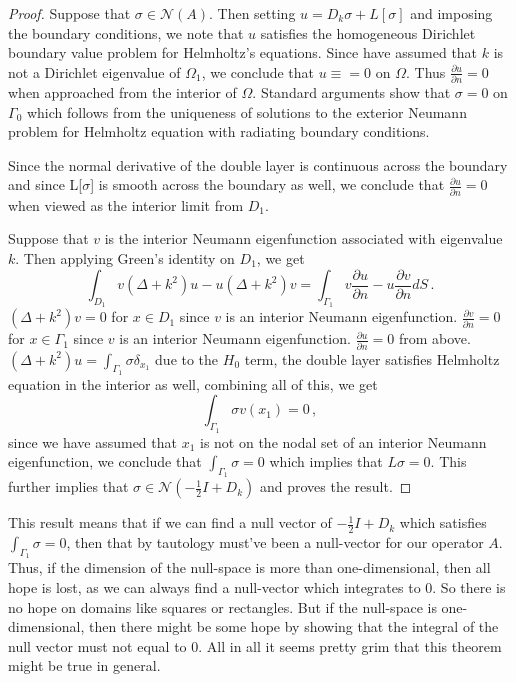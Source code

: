 \documentclass[preprint,12pt]{article}
\def\cN{{\mathcal N}}
\begin{document}
\begin{proof}
Suppose that $\sigma \in \cN(A)$. Then setting $u = D_{k} \sigma + L[\sigma]$ and imposing the boundary conditions, 
we note that $u$ satisfies the homogeneous Dirichlet boundary value problem for Helmholtz's equations. 
Since have assumed that $k$ is not a Dirichlet eigenvalue of $\Omega_{1}$, we conclude that
$u\equiv = 0$ on $\Omega$. 
Thus $\frac{\partial u}{\partial n} = 0$ when approached from the interior of $\Omega$. 
Standard arguments show that $\sigma =0$ on $\Gamma_{0}$ which follows from the uniqueness of solutions
to the exterior Neumann problem for Helmholtz equation with radiating boundary conditions.

Since the normal derivative of the double layer is continuous across the boundary and since L[$\sigma$] 
is smooth across the boundary as well, we conclude that $\frac{\partial u}{\partial n} = 0$ 
when viewed as the interior limit from $D_{1}$. 


Suppose that $v$ is the interior Neumann eigenfunction associated with eigenvalue $k$. 
Then applying Green's identity on $D_{1}$, we get
\begin{equation}
\int_{D_{1}} v (\Delta + k^2) u - u (\Delta+k^2) v =
\int_{\Gamma_{1}} v \frac{\partial u}{\partial n} - u \frac{\partial v}{\partial n} dS \, .
\end{equation}
$(\Delta + k^2)v = 0$ for $x\in D_{1}$ since $v$ is an interior Neumann eigenfunction.
$\frac{\partial v}{\partial n} = 0$ for $x\in \Gamma_{1}$ since $v$ is an interior Neumann eigenfunction.
$\frac{\partial u}{\partial n} = 0$ from above. 
$(\Delta+k^2)u =\int_{\Gamma_{1}} \sigma \delta_{x_{1}}$ due to the $H_{0}$ term, the double layer satisfies Helmholtz equation
in the interior as well, combining all of this, we get
\begin{equation}
\int_{\Gamma_{1}} \sigma v(x_{1}) = 0 \, ,
\end{equation}
since we have assumed that $x_{1}$ is not on the nodal set of an interior Neumann eigenfunction, we conclude that
$\int_{\Gamma_{1}} \sigma = 0$ which implies that $L\sigma = 0$.
This further implies that $\sigma \in \cN( -\frac{1}{2} I + D_{k})$ and proves the result. 
\end{proof}

This result means that if we can find a null vector of $-\frac{1}{2} I + D_{k}$ which satisfies
$\int_{\Gamma_{1}} \sigma = 0$, then that by tautology must've been a null-vector for our operator $A$.
Thus, if the dimension of the null-space is more than one-dimensional, then all hope is lost, as we can
always find a null-vector which integrates to $0$. So there is no hope on domains like squares or rectangles.
But if the null-space is one-dimensional, then there might be some hope by showing that 
the integral of the null vector must not equal to $0$. All in all it seems pretty grim that this theorem might
be true in general. 
\end{document}
